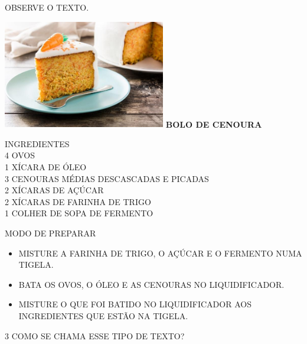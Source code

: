 %

OBSERVE O TEXTO.

\includegraphics[width=2.79286in,height=1.86042in]{media/image153.jpg}
\textbf{BOLO DE CENOURA}

INGREDIENTES\\
4 OVOS\\
1 XÍCARA DE ÓLEO\\
3 CENOURAS MÉDIAS DESCASCADAS E PICADAS\\
2 XÍCARAS DE AÇÚCAR\\
2 XÍCARAS DE FARINHA DE TRIGO\\
1 COLHER DE SOPA DE FERMENTO

MODO DE PREPARAR

\begin{itemize}
\item
  MISTURE A FARINHA DE TRIGO, O AÇÚCAR E O FERMENTO NUMA TIGELA.

\item
  BATA OS OVOS, O ÓLEO E AS CENOURAS NO LIQUIDIFICADOR.

\item
  MISTURE O QUE FOI BATIDO NO LIQUIDIFICADOR AOS INGREDIENTES QUE ESTÃO NA TIGELA.
\end{itemize}



\num{3} COMO SE CHAMA ESSE TIPO DE TEXTO?


